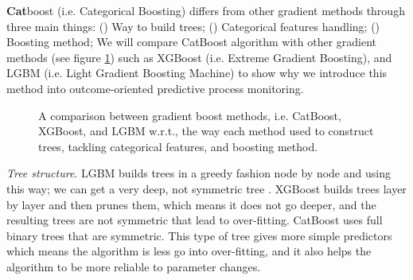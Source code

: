 \textbf{Cat}boost (i.e. Categorical Boosting) differs from other gradient methods through three main things: () Way to build trees; () Categorical features handling; ()  Boosting method; We will compare CatBoost algorithm with other gradient methods (see figure \ref{fig:catb}) such as XGBoost (i.e. Extreme Gradient Boosting), and LGBM (i.e. Light Gradient Boosting Machine) to show why we introduce this method into outcome-oriented predictive process monitoring.


\begin{figure}[htb]
	\begin{center}
		\caption[CatBoost vs XGBoost vs LGBM]{A comparison between gradient boost methods, i.e. CatBoost, XGBoost, and LGBM w.r.t., the way each method used to construct trees, tackling categorical features, and boosting method. }
		\label{fig:catb}
	\end{center}
\end{figure}

\textit{Tree structure}. LGBM builds trees in a greedy fashion node by node and using this way; we can get a very deep, not symmetric tree \cite{ke2017lightgbm}. XGBoost builds trees layer by layer and then prunes them, which means it does not go deeper, and the resulting trees are not symmetric that lead to over-fitting. CatBoost uses full binary trees that are symmetric. This type of tree gives more simple predictors which means the algorithm is less go into over-fitting, and it also helps the algorithm to be more reliable to parameter changes.

